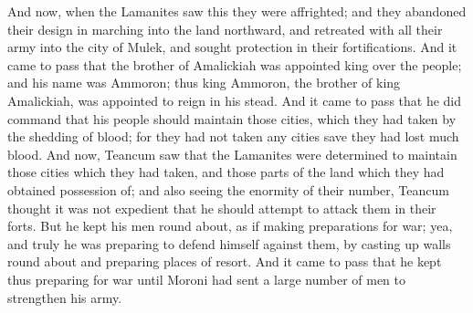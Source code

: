 And now, when the Lamanites saw this they were affrighted; and they abandoned their design in marching into the land northward, and retreated with all their army into the city of Mulek, and sought protection in their fortifications.
\bverse \iffalse And it came to pass that the brother of Amalickiah was appointed king over the people; and his name was Ammoron; thus king Ammoron, the brother of king Amalickiah, was appointed to reign in his stead. \fi
And it came to pass that the brother of Amalickiah was appointed king over the people; and his name was Ammoron; thus king Ammoron, the brother of king Amalickiah, was appointed to reign in his stead.
\bverse \iffalse And it came to pass that he did command that his people should maintain those cities, which they had taken by the shedding of blood; for they had not taken any cities save they had lost much blood. \fi
And it came to pass that he did command that his people should maintain those cities, which they had taken by the shedding of blood; for they had not taken any cities save they had lost much blood.
\bverse \iffalse And now, Teancum saw that the Lamanites were determined to maintain those cities which they had taken, and those parts of the land which they had obtained possession of; and also seeing the enormity of their number, Teancum thought it was not expedient that he should attempt to attack them in their forts. \fi
And now, Teancum saw that the Lamanites were determined to maintain those cities which they had taken, and those parts of the land which they had obtained possession of; and also seeing the enormity of their number, Teancum thought it was not expedient that he should attempt to attack them in their forts.
\bverse \iffalse But he kept his men round about, as if making preparations for war; yea, and truly he was preparing to defend himself against them, by casting up walls round about and preparing places of resort. \fi
But he kept his men round about, as if making preparations for war; yea, and truly he was preparing to defend himself against them, by casting up walls round about and preparing places of resort.
\bverse \iffalse And it came to pass that he kept thus preparing for war until Moroni had sent a large number of men to strengthen his army. \fi
And it came to pass that he kept thus preparing for war until Moroni had sent a large number of men to strengthen his army.
\bverse \iffalse And Moroni also sent orders unto him that he should retain all the prisoners who fell into his hands; for as the Lamanites had taken many prisoners, that he should retain all the prisoners of the Lamanites as a ransom for those whom the Lamanites had taken. \fi
